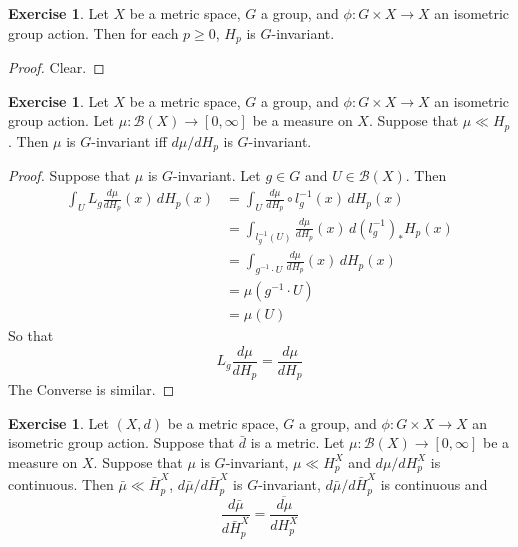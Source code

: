 \documentclass[12pt]{amsart}
\theoremstyle{definition}
\newtheorem{ex}[definition]{Exercise}
\newcommand{\MB}{\mathcal{B}}
\begin{document}
	\begin{ex}
	Let $X$ be a metric space, $G$ a group, and $\phi: G \times X \rightarrow X$ an isometric group action. Then for each $p \geq 0$, $H_p$ is $G$-invariant. 
	\end{ex}	
	
	\begin{proof}
	Clear.
	\end{proof}
	
	\begin{ex}
	Let $X$ be a metric space, $G$ a group, and $\phi: G \times X \rightarrow X$ an isometric group action. Let $\mu: \MB(X) \rightarrow [0, \infty]$ be a measure on $X$. Suppose that $\mu \ll H_p$. Then $\mu$ is $G$-invariant iff $d\mu /d H_p$ is $G$-invariant.
	\end{ex}	
	
	\begin{proof}
	Suppose that $\mu$ is $G$-invariant. Let $g \in G$ and $U \in \MB(X)$. Then 
	\begin{align*}
	\int_U L_g \frac{d\mu}{d H_p}(x) \, d  H_p (x)
	&= \int_U \frac{d\mu}{d H_p} \circ l_{g}^{-1}(x) \, d  H_p(x) \\
	&= \int_{l_{g}^{-1}( U) } \frac{d\mu}{d H_p}(x) \, d (l_{g}^{-1})_*H_p(x) \\
	&= \int_{g^{-1} \cdot U } \frac{d\mu}{d H_p}(x) \, d H_p(x) \\
	&= \mu(g^{-1} \cdot U) \\
	&= \mu (U)
	\end{align*}
	So that \begin{equation*}
	L_g \frac{d\mu}{d H_p} = \frac{d\mu}{d H_p}
	\end{equation*}
	The Converse is similar.
	\end{proof}
	
	\begin{ex}
	Let $(X, d)$ be a metric space, $G$ a group, and $\phi: G \times X \rightarrow X$ an isometric group action. Suppose that $\bar{d}$ is a metric. Let $\mu: \MB(X) \rightarrow [0, \infty]$ be a measure on $X$. Suppose that $\mu$ is $G$-invariant, $\mu \ll H_p^X$ and $d\mu / dH_p^X$ is continuous. Then $\bar{\mu} \ll \bar{H}_p^X$, $d\bar{\mu}/d \bar{H}_p^X$ is $G$-invariant, $d\bar{\mu}/d \bar{H}_p^X$ is continuous and 
	\begin{equation*}
	\frac{d \bar{\mu}}{d \bar{H}_p^X} = \overline{\frac{d \mu}{d H_p^X}}
	\end{equation*}
	\end{ex}
	
\end{document}
